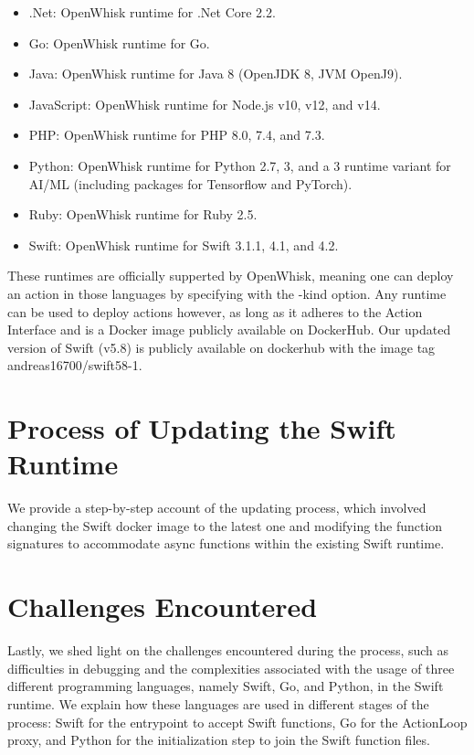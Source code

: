 \begin{itemize}
\item .Net: OpenWhisk runtime for .Net Core 2.2.
\item Go: OpenWhisk runtime for Go.
\item Java: OpenWhisk runtime for Java 8 (OpenJDK 8, JVM OpenJ9).
\item JavaScript: OpenWhisk runtime for Node.js v10, v12, and v14.
\item PHP: OpenWhisk runtime for PHP 8.0, 7.4, and 7.3.
\item Python: OpenWhisk runtime for Python 2.7, 3, and a 3 runtime variant for AI/ML (including packages for Tensorflow and PyTorch).
\item Ruby: OpenWhisk runtime for Ruby 2.5.
\item Swift: OpenWhisk runtime for Swift 3.1.1, 4.1, and 4.2.
\end{itemize}

These runtimes are officially supperted by OpenWhisk, meaning one can deploy an action in those languages by specifying with the -kind option.
Any runtime can be used to deploy actions however, as long as it adheres to the Action Interface and is a Docker image publicly available on DockerHub. Our updated version of Swift (v5.8) is publicly available on dockerhub with the image tag andreas16700/swift58-1.
\section{Process of Updating the Swift Runtime}
\label{sec:UpdatingProcess}

We provide a step-by-step account of the updating process, which involved changing the Swift docker image to the latest one and modifying the function signatures to accommodate async functions within the existing Swift runtime.

\section{Challenges Encountered}
\label{sec:Challenges}

Lastly, we shed light on the challenges encountered during the process, such as difficulties in debugging and the complexities associated with the usage of three different programming languages, namely Swift, Go, and Python, in the Swift runtime. We explain how these languages are used in different stages of the process: Swift for the entrypoint to accept Swift functions, Go for the ActionLoop proxy, and Python for the initialization step to join the Swift function files.


